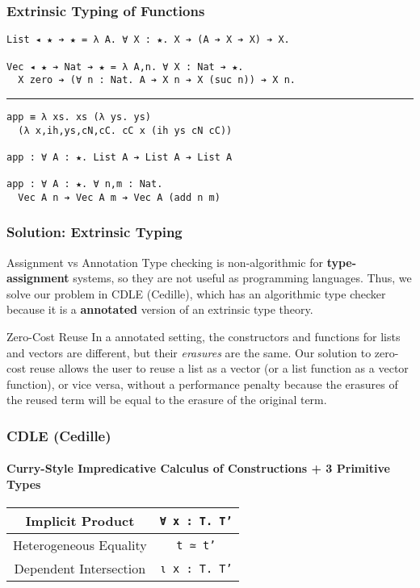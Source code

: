 \documentclass[mathserif,usenames,dvipsnames]{beamer}
\begin{document}
\begin{frame}[fragile]
\frametitle{Extrinsic Typing of Functions}

\begin{verbatim}
List ◂ ★ ➔ ★ = λ A. ∀ X : ★. X ➔ (A ➔ X ➔ X) ➔ X.

Vec ◂ ★ ➔ Nat ➔ ★ = λ A,n. ∀ X : Nat ➔ ★.
  X zero ➔ (∀ n : Nat. A ➔ X n ➔ X (suc n)) ➔ X n.
\end{verbatim}

\noindent\rule{\textwidth}{1pt}

\begin{verbatim}
app ≡ λ xs. xs (λ ys. ys) 
  (λ x,ih,ys,cN,cC. cC x (ih ys cN cC))

app : ∀ A : ★. List A ➔ List A ➔ List A

app : ∀ A : ★. ∀ n,m : Nat. 
  Vec A n ➔ Vec A m ➔ Vec A (add n m)
\end{verbatim}

\end{frame}

\begin{frame}[fragile]
\frametitle{Solution: Extrinsic Typing}

\begin{block}{Assignment vs Annotation}
Type checking is non-algorithmic for \textbf{type-assignment} systems, so they
are not useful as programming languages. Thus, we solve our problem in
CDLE (Cedille), which has an algorithmic type checker because it
is a \textbf{annotated} version of an extrinsic type theory.
\end{block}

\begin{block}{Zero-Cost Reuse}
In a annotated setting, the constructors and functions for lists
and vectors are different, but their \textit{erasures} are the
same. Our solution to zero-cost reuse allows the user to reuse a list
as a vector (or a list function as a vector function), or vice versa,
without a performance penalty because the erasures of the reused term
will be equal to the erasure of the original term.
\end{block}

\end{frame}

\begin{frame}
\frametitle{CDLE (Cedille)}
\framesubtitle{Curry-Style Impredicative Calculus of Constructions + 3 Primitive Types}

\begin{center}
\begin{tabular}{ |c||c| } 
 \hline
 Implicit Product & \texttt{∀ x : T. T'} \\
 \hline
 Heterogeneous Equality & \texttt{t ≃ t'} \\
 \hline
 Dependent Intersection & \texttt{ι x : T. T'} \\
 \hline
\end{tabular}
\end{center}

\end{frame}
\end{document}
